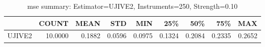 \begin{table}[ht]
\centering
\caption{mse summary: Estimator=UJIVE2, Instruments=250, Strength=0.10}
\begin{tabular}{lrrrrrrrr}
\toprule
 & COUNT & MEAN & STD & MIN & 25\% & 50\% & 75\% & MAX \\
\midrule
UJIVE2 & 10.0000 & 0.1882 & 0.0596 & 0.0975 & 0.1324 & 0.2084 & 0.2335 & 0.2652 \\
\bottomrule
\end{tabular}
\end{table}
